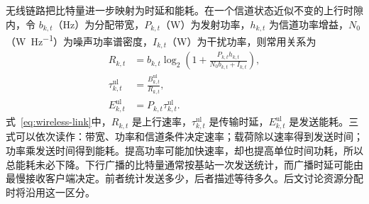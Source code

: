 无线链路把比特量进一步映射为时延和能耗。在一个信道状态近似不变的上行时隙内，令 \(b_{k,t}\)（\si{\hertz}）为分配带宽，\(P_{k,t}\)（\si{\watt}）为发射功率，\(h_{k,t}\) 为信道功率增益，\(N_0\)（\si{\watt\per\hertz}）为噪声功率谱密度，\(I_{k,t}\)（\si{\watt}）为干扰功率，则常用关系为\cite{Tran2019WirelessOptimization,Dinh2021WirelessConvergence}
\begin{subequations}\label{eq:wireless-link}
  \begin{align}
    R_{k,t}&=b_{k,t}\log_2\!\left(
      1+\frac{P_{k,t}h_{k,t}}
      {N_0b_{k,t}+I_{k,t}}\right),\label{eq:uplink-rate}\\
    \tau_{k,t}^{\mathrm{ul}}
      &=\frac{B_{k,t}^{\mathrm{ul}}}{R_{k,t}},\label{eq:uplink-delay}\\
    E_{k,t}^{\mathrm{ul}}
      &=P_{k,t}\tau_{k,t}^{\mathrm{ul}}.\label{eq:uplink-energy}
  \end{align}
\end{subequations}
式~\eqref{eq:wireless-link}中，\(R_{k,t}\) 是上行速率，\(\tau_{k,t}^{\mathrm{ul}}\) 是传输时延，\(E_{k,t}^{\mathrm{ul}}\) 是发送能耗。三式可以依次读作：带宽、功率和信道条件决定速率；载荷除以速率得到发送时间；功率乘发送时间得到能耗。提高功率可能加快速率，却也提高单位时间功耗，所以总能耗未必下降。下行广播的比特量通常按基站一次发送统计，而广播时延可能由最慢接收客户端决定。前者统计发送多少，后者描述等待多久。后文讨论资源分配时将沿用这一区分\cite{Dinh2021WirelessConvergence,Zhang2023EdgeFLSurvey}。
